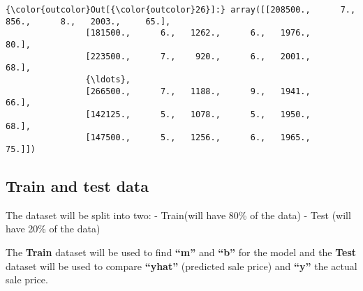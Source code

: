 \documentclass[11pt]{article}
\begin{document}
\begin{Verbatim}[commandchars=\\\{\}]
{\color{outcolor}Out[{\color{outcolor}26}]:} array([[208500.,      7.,    856.,      8.,   2003.,     65.],
                [181500.,      6.,   1262.,      6.,   1976.,     80.],
                [223500.,      7.,    920.,      6.,   2001.,     68.],
                {\ldots},
                [266500.,      7.,   1188.,      9.,   1941.,     66.],
                [142125.,      5.,   1078.,      5.,   1950.,     68.],
                [147500.,      5.,   1256.,      6.,   1965.,     75.]])
\end{Verbatim}
            
    \hypertarget{train-and-test-data}{%
\subsection{Train and test data}\label{train-and-test-data}}

The dataset will be split into two: - Train(will have 80\% of the data)
- Test (will have 20\% of the data)

The \textbf{Train} dataset will be used to find \textbf{``m''} and
\textbf{``b''} for the model and the \textbf{Test} dataset will be used
to compare \textbf{``yhat''} (predicted sale price) and \textbf{``y''}
the actual sale price.
\end{document}
